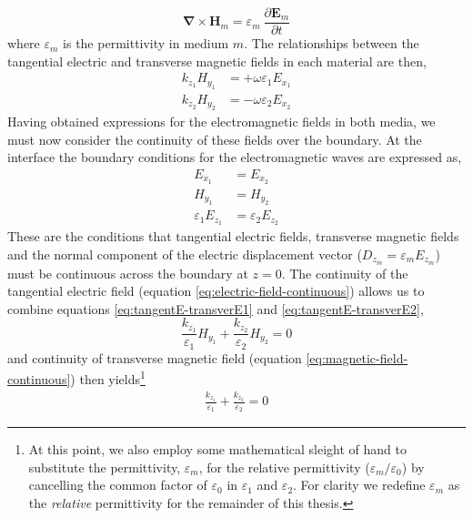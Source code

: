 \documentclass[oneside,10pt,a4paper]{book}
\begin{document}
\begin{equation*}
\mathbf{\nabla}\times\mathbf{H}_m=\varepsilon_m\:\frac{\partial\mathbf{E}_m}{\partial t}
\end{equation*}
where $\varepsilon_m$ is the permittivity in medium $m$. The relationships between the tangential electric and transverse magnetic fields in each material are then,
\begin{align}
k_{z_1}H_{y_1}&=+\omega\varepsilon_1E_{x_1}\label{eq:tangentE-transverE1}\\
k_{z_2}H_{y_2}&=-\omega\varepsilon_2E_{x_2}\label{eq:tangentE-transverE2}
\end{align}
Having obtained expressions for the electromagnetic fields in both media, we must now consider the continuity of these fields over the boundary. At the interface the boundary conditions for the electromagnetic waves are expressed as,
\begin{align}
E_{x_1}&=E_{x_2}\label{eq:electric-field-continuous}\\
H_{y_1}&=H_{y_2}\label{eq:magnetic-field-continuous}\\
\varepsilon_1E_{z_1}&=\varepsilon_2E_{z_2}\label{eq:d-continuous}
\end{align}
These are the conditions that tangential electric fields, transverse magnetic fields and the normal component of the electric displacement vector ($D_{z_m}=\varepsilon_m E_{z_m}$) must be continuous across the boundary at $z=0$. The continuity of the tangential electric field (equation \ref{eq:electric-field-continuous}) allows us to combine equations \ref{eq:tangentE-transverE1} and \ref{eq:tangentE-transverE2},
\begin{equation*}
\frac{k_{z_1}}{\varepsilon_1}H_{y_1}+\frac{k_{z_2}}{\varepsilon_2}H_{y_2}=0
\end{equation*}
and continuity of transverse magnetic field (equation \ref{eq:magnetic-field-continuous}) then yields\footnote{At this point, we also employ some mathematical sleight of hand to substitute the permittivity, $\varepsilon_m$, for the relative permittivity ($\varepsilon_m/\varepsilon_0$) by cancelling the common factor of $\varepsilon_0$ in $\varepsilon_1$ and $\varepsilon_2$. For clarity we redefine $\varepsilon_m$ as the \textit{relative} permittivity for the remainder of this thesis.}
\begin{align}
\frac{k_{z_1}}{\varepsilon_1}+\frac{k_{z_2}}{\varepsilon_2}=0\label{eq:relation-of-kz1-kz2}
\end{align}
\end{document}
